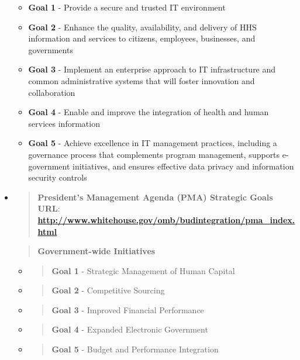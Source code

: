 \documentclass[a4paper, 11pt]{article}
\begin{document}
\begin{itemize}
\begin{itemize}
\item
  \textbf{Goal 1} - Provide a secure and trusted IT environment
\item
  \textbf{Goal 2} - Enhance the quality, availability, and delivery of
  HHS information and services to citizens, employees, businesses, and
  governments
\item
  \textbf{Goal 3} - Implement an enterprise approach to IT
  infrastructure and common administrative systems that will foster
  innovation and collaboration
\item
  \textbf{Goal 4} - Enable and improve the integration of health and
  human services information
\item
  \textbf{Goal 5} - Achieve excellence in IT management practices,
  including a governance process that complements program management,
  supports e-government initiatives, and ensures effective data privacy
  and information security controls
\end{itemize}

\item
  \begin{quote}
  \textbf{President's Management Agenda (PMA) Strategic Goals}\\
  \textbf{URL}:
  \href{http://www.whitehouse.gov/omb/budintegration/pma_index.html}{\textbf{http://www.whitehouse.gov/omb/budintegration/pma\_index.html}}
  \end{quote}

\begin{quote}
\textbf{Government-wide Initiatives}
\end{quote}

\begin{itemize}
\item
  \begin{quote}
  \textbf{Goal 1} - Strategic Management of Human Capital
  \end{quote}
\item
  \begin{quote}
  \textbf{Goal 2} - Competitive Sourcing
  \end{quote}
\item
  \begin{quote}
  \textbf{Goal 3} - Improved Financial Performance
  \end{quote}
\item
  \begin{quote}
  \textbf{Goal 4} - Expanded Electronic Government
  \end{quote}
\item
  \begin{quote}
  \textbf{Goal 5} - Budget and Performance Integration
  \end{quote}
\end{itemize}


\end{itemize}
\end{document}
